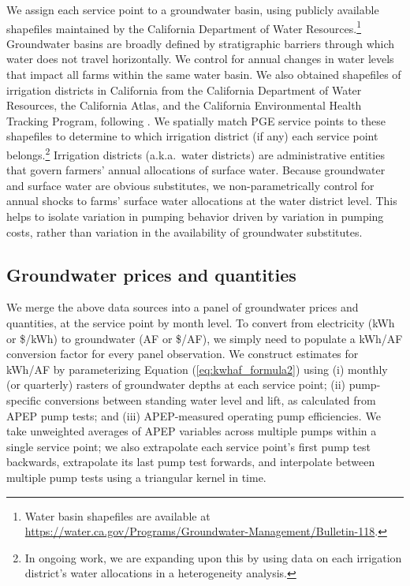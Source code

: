 We assign each service point to a groundwater basin, using publicly available shapefiles maintained by the California Department of Water Resources.\footnote{Water basin shapefiles are available at \url{https://water.ca.gov/Programs/Groundwater-Management/Bulletin-118}. 
}
 Groundwater basins are broadly defined by stratigraphic barriers through which water does not travel horizontally. We control for annual changes in water levels that impact all farms within the same water basin. We also obtained shapefiles of irrigation districts in California from the California Department of Water Resources, the California Atlas, and the California Environmental Health Tracking Program, following \textcite{hagerty2019}. We spatially match PGE service points to these shapefiles to determine to which irrigation district (if any) each service point belongs.\footnote{In ongoing work, we are expanding upon this by using data on each irrigation district's water allocations in a heterogeneity analysis.} Irrigation districts (a.k.a.\ water districts) are administrative entities that govern farmers' annual allocations of surface water. Because groundwater and surface water are obvious substitutes, we non-parametrically control for annual shocks to farms' surface water allocations at the water district level. This helps to isolate variation in pumping behavior driven by variation in pumping costs, rather than variation in the availability of groundwater substitutes.

\subsection{Groundwater prices and quantities}

We merge the above data sources into a panel of groundwater prices and quantities, at the service point by month level. To convert from electricity (kWh or \$/kWh) to groundwater (AF or \$/AF), we simply need to populate a kWh/AF conversion factor for every panel observation. We construct estimates for kWh/AF by parameterizing Equation (\ref{eq:kwhaf_formula2}) using (i) monthly (or quarterly) rasters of groundwater depths at each service point; (ii) pump-specific conversions between standing water level and lift, as calculated from APEP pump tests; and (iii) APEP-measured operating pump efficiencies. We take unweighted averages of APEP variables across multiple pumps within a single service point; we also extrapolate each service point's first pump test backwards, extrapolate its last pump test forwards, and interpolate between multiple pump tests using a triangular kernel in time. 

